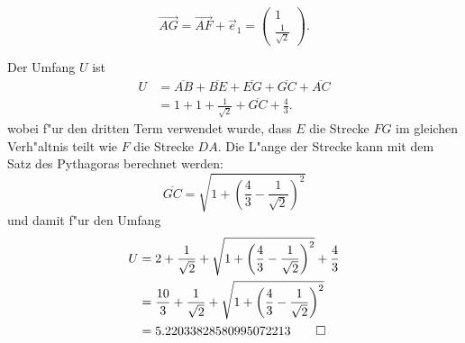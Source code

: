 \begin{loesung}
\begin{teilaufgaben}
\begin{enumerate}
\[
\overrightarrow{AG}
=
\overrightarrow{AF}+\vec{e}_1
=
\begin{pmatrix}1\\\frac1{\sqrt{2}}\end{pmatrix}.
\]
\end{enumerate}
\item
Der Umfang $U$ ist
\begin{align*}
U
&=
\overline{AB} + \overline{BE} + \overline{EG} + \overline{GC} +\overline{AC}
\\
&=
1 + 1 + \frac1{\sqrt{2}}+\overline{GC} + \frac43.
\end{align*}
wobei f"ur den dritten Term verwendet wurde, dass $E$ die Strecke
$FG$ im gleichen Verh"altnis teilt wie $F$ die Strecke $DA$.
Die L"ange der Strecke kann mit dem Satz des Pythagoras berechnet
werden:
\[
\overline{GC}
=
\sqrt{1+\left(\frac43-\frac1{\sqrt{2}}\right)^2}
\]
und damit f"ur den Umfang
\begin{align*}
U
&=
 2
+ \frac1{\sqrt{2}}
+ \sqrt{1+\left(\frac43-\frac1{\sqrt{2}}\right)^2}
+ \frac43
\\
&=
\frac{10}{3}
+ \frac1{\sqrt{2}}
+ \sqrt{1+\left(\frac43-\frac1{\sqrt{2}}\right)^2}
\\
&=
5.22033828580995072213
\qedhere
\end{align*}
\end{teilaufgaben}
\end{loesung}

